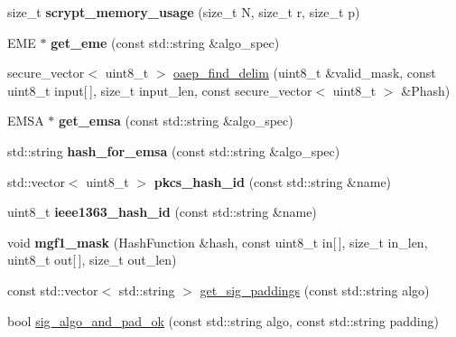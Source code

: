 \begin{DoxyCompactItemize}
\item 
\mbox{\label{namespace_botan_a5c00a4b36c5eb825bbb255f4c3a1ad8f}} 
size\+\_\+t {\bfseries scrypt\+\_\+memory\+\_\+usage} (size\+\_\+t N, size\+\_\+t r, size\+\_\+t p)
\item 
\mbox{\label{namespace_botan_a2be9e702614ad3e7041e11bcfe58ca35}} 
E\+ME $\ast$ {\bfseries get\+\_\+eme} (const std\+::string \&algo\+\_\+spec)
\item 
secure\+\_\+vector$<$ uint8\+\_\+t $>$ \mbox{\hyperlink{namespace_botan_a3778103665c2cb22e4f311002755cd53}{oaep\+\_\+find\+\_\+delim}} (uint8\+\_\+t \&valid\+\_\+mask, const uint8\+\_\+t input\mbox{[}$\,$\mbox{]}, size\+\_\+t input\+\_\+len, const secure\+\_\+vector$<$ uint8\+\_\+t $>$ \&Phash)
\item 
\mbox{\label{namespace_botan_a4ac97b092d7b217da05528ac462e5622}} 
E\+M\+SA $\ast$ {\bfseries get\+\_\+emsa} (const std\+::string \&algo\+\_\+spec)
\item 
\mbox{\label{namespace_botan_a312997431c545c396ff37598d7788fe0}} 
std\+::string {\bfseries hash\+\_\+for\+\_\+emsa} (const std\+::string \&algo\+\_\+spec)
\item 
\mbox{\label{namespace_botan_a8823bb54b388389f618f9ae896d38992}} 
std\+::vector$<$ uint8\+\_\+t $>$ {\bfseries pkcs\+\_\+hash\+\_\+id} (const std\+::string \&name)
\item 
\mbox{\label{namespace_botan_af4be2d703e9ade53826bc2ab6c899f4d}} 
uint8\+\_\+t {\bfseries ieee1363\+\_\+hash\+\_\+id} (const std\+::string \&name)
\item 
\mbox{\label{namespace_botan_a00b321657543140cf44d468926021790}} 
void {\bfseries mgf1\+\_\+mask} (Hash\+Function \&hash, const uint8\+\_\+t in\mbox{[}$\,$\mbox{]}, size\+\_\+t in\+\_\+len, uint8\+\_\+t out\mbox{[}$\,$\mbox{]}, size\+\_\+t out\+\_\+len)
\item 
const std\+::vector$<$ std\+::string $>$ \mbox{\hyperlink{namespace_botan_a68b05d4e236673d9d185cbfb1144cebc}{get\+\_\+sig\+\_\+paddings}} (const std\+::string algo)
\item 
bool \mbox{\hyperlink{namespace_botan_ae2167ee9b593409c1ca300b1fbec0691}{sig\+\_\+algo\+\_\+and\+\_\+pad\+\_\+ok}} (const std\+::string algo, const std\+::string padding)

\end{DoxyCompactItemize}
